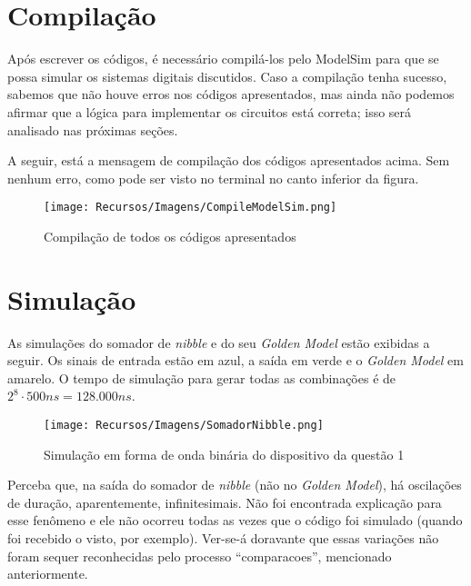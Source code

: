 \documentclass[a4paper,12pt]{article}
\begin{document}
\section{Compilação}
Após escrever os códigos, é necessário compilá-los pelo ModelSim para que se possa simular os sistemas digitais discutidos. Caso a compilação tenha sucesso, sabemos que não houve erros nos códigos apresentados, mas ainda não podemos afirmar que a lógica para implementar os circuitos está correta; isso será analisado nas próximas seções.

A seguir, está a mensagem de compilação dos códigos apresentados acima. Sem nenhum erro, como pode ser visto no terminal no canto inferior da figura.

\begin{figure}[H]
    \centering
    \texttt{[image: Recursos/Imagens/CompileModelSim.png]}
    \caption{Compilação de todos os códigos apresentados}
\end{figure}

\newpage

\section{Simulação}
As simulações do somador de \textit{nibble} e do seu \textit{Golden Model} estão exibidas a seguir. Os sinais de entrada estão em azul, a saída em verde e o \textit{Golden Model} em amarelo. O tempo de simulação para gerar todas as combinações é de $2^8\cdot 500ns = 128.000ns$.

\begin{figure}[H]
    \centering
    \begin{tcolorbox}[colframe=cinza, colback=white, boxrule=0.75pt, arc=0pt, width=1\textwidth, center, boxsep=0pt, left=0pt, right=0pt, top=0pt, bottom=0pt]
    \texttt{[image: Recursos/Imagens/SomadorNibble.png]}
    \end{tcolorbox}
    \caption{Simulação em forma de onda binária do dispositivo da questão 1}
\end{figure}

Perceba que, na saída do somador de \textit{nibble} (não no \textit{Golden Model}), há oscilações de duração, aparentemente, infinitesimais. Não foi encontrada explicação para esse fenômeno e ele não ocorreu todas as vezes que o código foi simulado (quando foi recebido o visto, por exemplo). Ver-se-á doravante que essas variações não foram sequer reconhecidas pelo processo ``comparacoes'', mencionado anteriormente.
\end{document}
